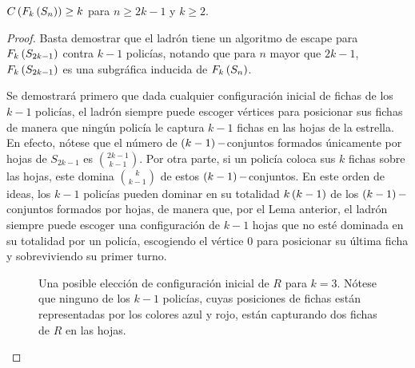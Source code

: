 \begin{teorema}
\label{teo:cota_estrella}
    $C\left( F_k \left( S_n\right)\right) \geq k$ para $n\geq 2k-1$ y $k\geq 2$.
\end{teorema}

\begin{proof}
    Basta demostrar que el ladr\'on tiene un algoritmo de escape para
    $F_{k}\left( S_{2k-1}\right)$ contra $k-1$ polic\'ias, notando que para $n$ mayor que
    $2k-1$, $F_{k}\left( S_{2k-1}\right)$ es una subgr\'afica inducida de $F_{k}\left( S_{n}\right)$.

    Se demostrar\'a primero que dada cualquier configuraci\'on inicial de fichas de
    los $k-1$ polic\'ias, el ladr\'on siempre puede escoger v\'ertices para posicionar
    sus fichas de manera que ning\'un polic\'ia le captura $k-1$ fichas en las hojas
    de la estrella. En efecto, n\'otese que el n\'umero de $\left( k-1\right)-$conjuntos
    formados \'unicamente por hojas de $S_{2k-1}$ es $\binom{2k-1}{k-1}$. Por otra
    parte, si un polic\'ia coloca sus $k$ fichas sobre las hojas, este domina
    $\binom{k}{k-1}$ de estos $\left( k-1\right)-$conjuntos. En este orden de ideas, los
    $k-1$ polic\'ias pueden dominar en su totalidad $k\left( k-1\right)$ de los
    $\left( k-1\right)-$conjuntos formados por hojas, de manera que, por el Lema anterior,
    el ladr\'on siempre puede escoger una configuraci\'on de $k-1$ hojas que no est\'e
    dominada en su totalidad por un polic\'ia, escogiendo el v\'ertice $0$ para
    posicionar su \'ultima ficha y sobreviviendo su primer turno. 

    \begin{figure}[h]
        \centering
        \caption{Una posible elecci\'on de configuraci\'on inicial de $R$ para $k=3$. N\'otese que ninguno de los $k-1$ polic\'ias, cuyas posiciones de fichas est\'an representadas por los colores azul y rojo, est\'an capturando dos fichas de $R$ en las hojas.}
        \label{fig:Configuracion_inicial}
    \end{figure}


\end{proof}
